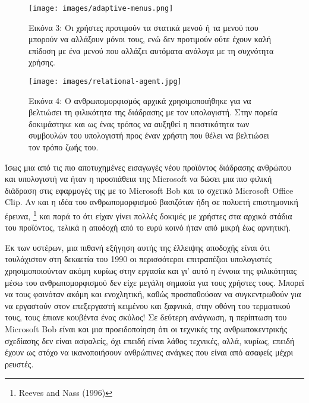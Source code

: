 \documentclass[
]{article}
\begin{document}
\leavevmode{}%
\begin{figure}
\hypertarget{fig:adaptive-menus}{%
\centering
\texttt{[image: images/adaptive-menus.png]}
\caption{Εικόνα 3: Οι χρήστες προτιμούν τα στατικά μενού ή τα μενού που
μπορούν να αλλάξουν μόνοι τους, ενώ δεν προτιμούν ούτε έχουν καλή
επίδοση με ένα μενού που αλλάζει αυτόματα ανάλογα με τη συχνότητα
χρήσης.}\label{fig:adaptive-menus}
}
\end{figure}

\leavevmode{}%
\begin{figure}
\hypertarget{fig:relational-agent}{%
\centering
\texttt{[image: images/relational-agent.jpg]}
\caption{Εικόνα 4: Ο ανθρωπομορφισμός αρχικά χρησιμοποιήθηκε για να
βελτιώσει τη φιλικότητα της διάδρασης με τον υπολογιστή. Στην πορεία
δοκιμάστηκε και ως ένας τρόπος να αυξηθεί η πειστικότητα των συμβουλών
του υπολογιστή προς έναν χρήστη που θέλει να βελτιώσει τον τρόπο ζωής
του.}\label{fig:relational-agent}
}
\end{figure}

Ίσως μια από τις πιο αποτυχημένες εισαγωγές νέου προϊόντος διάδρασης
ανθρώπου και υπολογιστή να ήταν η προσπάθεια της Microsoft να δώσει μια
πιο φιλική διάδραση στις εφαρμογές της με το Microsoft Bob και το
σχετικό Microsoft Office Clip. Αν και η ιδέα του ανθρωπομορφισμού
βασιζόταν ήδη σε πολυετή επιστημονική έρευνα, \footnote{Reeves and Nass
  (1996)} και παρά το ότι είχαν γίνει πολλές δοκιμές με χρήστες στα
αρχικά στάδια του προϊόντος, τελικά η αποδοχή από το ευρύ κοινό ήταν από
μικρή έως αρνητική.

Εκ των υστέρων, μια πιθανή εξήγηση αυτής της έλλειψης αποδοχής είναι ότι
τουλάχιστον στη δεκαετία του 1990 οι περισσότεροι επιτραπέζιοι
υπολογιστές χρησιμοποιούνταν ακόμη κυρίως στην εργασία και γι' αυτό η
έννοια της φιλικότητας μέσω του ανθρωπομορφισμού δεν είχε μεγάλη σημασία
για τους χρήστες τους. Μπορεί να τους φαινόταν ακόμη και ενοχλητική,
καθώς προσπαθούσαν να συγκεντρωθούν για να εργαστούν στον επεξεργαστή
κειμένου και ξαφνικά, στην οθόνη του τερματικού τους, τους έπιανε
κουβέντα ένας σκύλος! Σε δεύτερη ανάγνωση, η περίπτωση του Microsoft Bob
είναι και μια προειδοποίηση ότι οι τεχνικές της ανθρωποκεντρικής
σχεδίασης δεν είναι ασφαλείς, όχι επειδή είναι λάθος τεχνικές, αλλά,
κυρίως, επειδή έχουν ως στόχο να ικανοποιήσουν ανθρώπινες ανάγκες που
είναι από ασαφείς μέχρι ρευστές.
\end{document}
